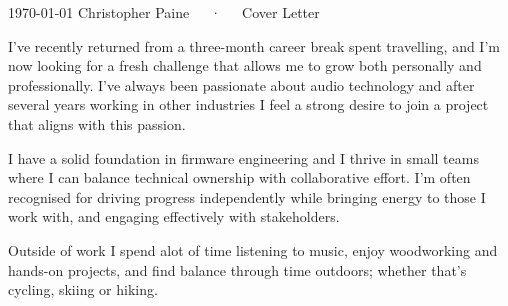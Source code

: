 \documentclass[11pt, a4paper]{awesome-cv}
\begin{document}
\makecvheader[R]

\makecvfooter
  {\today}
  {Christopher Paine~~~·~~~Cover Letter}
  {}

\makelettertitle

\begin{cvletter}

I’ve recently returned from a three-month career break spent travelling, and I’m now looking for a fresh challenge that allows me to grow both personally and professionally. 
I've always been passionate about audio technology and after several years working in other industries I feel a strong desire to join a project that aligns with this passion. 

I have a solid foundation in firmware engineering and I thrive in small teams where I can balance technical ownership with collaborative effort. I'm often recognised for driving progress independently while bringing energy to those I work with, and engaging effectively with stakeholders.

Outside of work I spend alot of time listening to music, enjoy woodworking and hands-on projects, and find balance through time outdoors; whether that’s cycling, skiing or hiking.


\end{cvletter}
\end{document}
